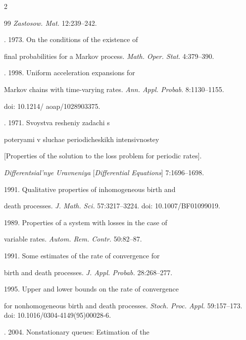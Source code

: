 \begin{multicols}{2}
{{\begin{thebibliography}{99}
\textit{Zastosow. Mat.} 12:239--242.




. 1973. On the conditions of the existence of

final probabilities for a Markov process. \textit{Math. Oper. Stat}. 4:379--390.




. 1998. Uniform acceleration expansions for

Markov chains with time-varying rates. \textit{Ann. Appl. Probab}. 8:1130--1155. 

doi: 10.1214/ aoap/1028903375.


. 1971. Svoystva re\-she\-niy zadachi s

poteryami v sluchae periodicheskikh intensivnostey

[Properties of the solution to the loss problem for periodic rates].

\textit{Differentsial'nye Uravneniya} [\textit{Differential Equations}] 7:1696--1698.


 1991. Qualitative properties of inhomogeneous birth and

death processes. \textit{J. Math. Sci.} 57:3217--3224. doi: 10.1007/BF01099019.


 1989. Properties of a system with losses in the case of

variable rates. \textit{Autom. Rem. Contr.} 50:82--87.


 1991. Some estimates of the rate of convergence for

birth and death processes. \textit{J. Appl. Probab.} 28:268--277.


 1995. Upper and lower bounds on the rate of convergence

for nonhomogeneous birth and death processes. \textit{Stoch. Proc. Appl.} 59:157--173. doi: 10.1016/0304-4149(95)00028-6.


. 2004. Nonstationary queues: Estimation of the


\end{thebibliography}}}
\end{multicols}

